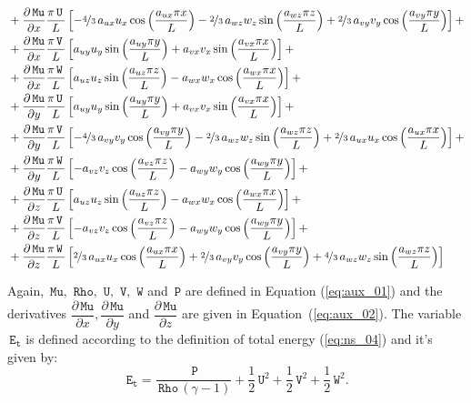 \documentclass[10pt]{article}
\newcommand{\diff}[2] {\dfrac{\partial #1}{\partial #2}}
\newcommand{\Rho}{\,\mathtt{Rho}}
\newcommand{\PP}{\,\mathtt{P}}
\newcommand{\U}{\,\mathtt{U}}
\newcommand{\V}{\,\mathtt{V}}
\newcommand{\W}{\,\mathtt{W}}
\newcommand{\Mu}{\,\mathtt{Mu}}
\newcommand{\DMuDx}{\diff{\Mu}{x}}
\newcommand{\DMuDy}{\diff{\Mu}{y}}
\newcommand{\DMuDz}{\diff{\Mu}{z}}
\newcommand{\Et}{\,\mathtt{E_t}}
\begin{document}
%
%
\begin{equation*}
 \begin{split}
&+ \DMuDx\frac{\pi \U \, }{L} \left[- \nicefrac{4}{3} \, a_{ux} u_{x} \cos\left(\frac{a_{ux} \pi x}{L}\right) - \nicefrac{2}{3} \, a_{wz} w_{z} \sin\left(\frac{a_{wz} \pi z}{L}\right) + \nicefrac{2}{3} \, a_{vy} v_{y} \cos\left(\frac{a_{vy} \pi y}{L}\right)\right]+ \\ 
&+ \DMuDx\frac{\pi \V \, }{L} \left[a_{uy} u_{y} \sin\left(\frac{a_{uy} \pi y}{L}\right) + a_{vx} v_{x} \sin\left(\frac{a_{vx} \pi x}{L}\right)\right] + \\ 
&+ \DMuDx\frac{\pi \W \, }{L} \left[a_{uz} u_{z} \sin\left(\frac{a_{uz} \pi z}{L}\right) - a_{wx} w_{x} \cos\left(\frac{a_{wx} \pi x}{L}\right)\right] + \\ 
&+ \DMuDy\frac{\pi \U \, }{L} \left[a_{uy} u_{y} \sin\left(\frac{a_{uy} \pi y}{L}\right) + a_{vx} v_{x} \sin\left(\frac{a_{vx} \pi x}{L}\right)\right] + \\ 
&+ \DMuDy\frac{\pi \V \, }{L} \left[- \nicefrac{4}{3} \, a_{vy} v_{y} \cos\left(\frac{a_{vy} \pi y}{L}\right) - \nicefrac{2}{3} \, a_{wz} w_{z} \sin\left(\frac{a_{wz} \pi z}{L}\right) + \nicefrac{2}{3} \, a_{ux} u_{x} \cos\left(\frac{a_{ux} \pi x}{L}\right)\right] + \\ 
&+ \DMuDy\frac{\pi \W \, }{L} \left[- a_{vz} v_{z} \cos\left(\frac{a_{vz} \pi z}{L}\right) - a_{wy} w_{y} \cos\left(\frac{a_{wy} \pi y}{L}\right)\right] + \\ 
&+ \DMuDz\frac{\pi \U \, }{L} \left[a_{uz} u_{z} \sin\left(\frac{a_{uz} \pi z}{L}\right) - a_{wx} w_{x} \cos\left(\frac{a_{wx} \pi x}{L}\right)\right] + \\ 
&+ \DMuDz\frac{\pi \V \, }{L} \left[- a_{vz} v_{z} \cos\left(\frac{a_{vz} \pi z}{L}\right) - a_{wy} w_{y} \cos\left(\frac{a_{wy} \pi y}{L}\right)\right] + \\ 
&+ \DMuDz\frac{\pi \W \, }{L} \left[\nicefrac{2}{3} \, a_{ux} u_{x} \cos\left(\frac{a_{ux} \pi x}{L}\right) + \nicefrac{2}{3} \, a_{vy} v_{y} \cos\left(\frac{a_{vy} \pi y}{L}\right) + \nicefrac{4}{3} \, a_{wz} w_{z} \sin\left(\frac{a_{wz} \pi z}{L}\right)\right]
 \end{split}
\end{equation*}

Again, $\Mu,\, \Rho,\,\U,\,\V,\,\W$ and $\PP$ are defined in Equation (\ref{eq:aux_01}) and the derivatives $\DMuDx,\DMuDy$ and $\DMuDz$ are given in Equation~(\ref{eq:aux_02}). The variable $\Et$ is defined according to the definition of total energy (\ref{eq:ns_04}) and it's given by:
$$\Et= \frac{\PP}{\Rho \, \left(\gamma-1\right)} + \frac{1}{2} \U^{2} + \frac{1}{2} \V^{2} + \frac{1}{2} \W^{2}.$$
\end{document}
